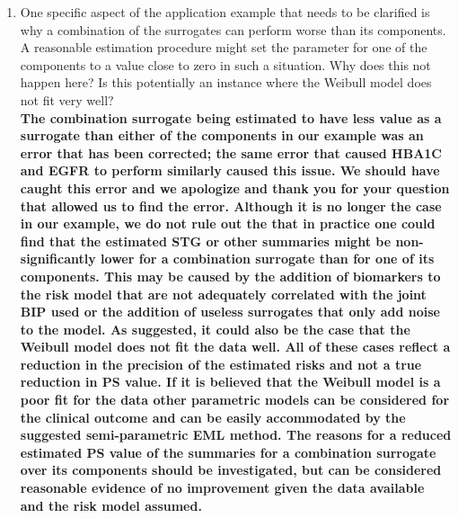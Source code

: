 \documentclass[11pt]{article} %
\begin{document}
\begin{enumerate}
\item One specific aspect of the application example that needs to be clarified is why a combination of the surrogates can perform worse than its components. A reasonable estimation procedure might set the parameter for one of the components to a value close to zero in such a situation. Why does this not happen here? Is this potentially an instance where the Weibull model does not fit very well?\\
\textbf{The combination surrogate being estimated to have less value as a surrogate than either of the components in our example was an error that has been corrected; the same error that caused HBA1C and EGFR to perform similarly caused this issue. We should have caught this error and we apologize and thank you for your question that allowed us to find the error. Although it is no longer the case in our example, we do not rule out the that in practice one could find that the estimated STG or other summaries might be non-significantly lower for a combination surrogate than for one of its components. This may be caused by the addition of biomarkers to the risk model that are not adequately correlated with the joint BIP used or the addition of useless surrogates that only add noise to the model. As suggested, it could also be the case that the Weibull model does not fit the data well. All of these cases reflect a reduction in the precision of the estimated risks and not a true reduction in PS value. If it is believed that the Weibull model is a poor fit for the data other parametric models can be considered for the clinical outcome and can be easily accommodated by the suggested semi-parametric EML method. The reasons for a reduced estimated PS value of the summaries for a combination surrogate over its components should be investigated, but can be considered reasonable evidence of no improvement given the data available and the risk model assumed.}


\end{enumerate}
\end{document}
